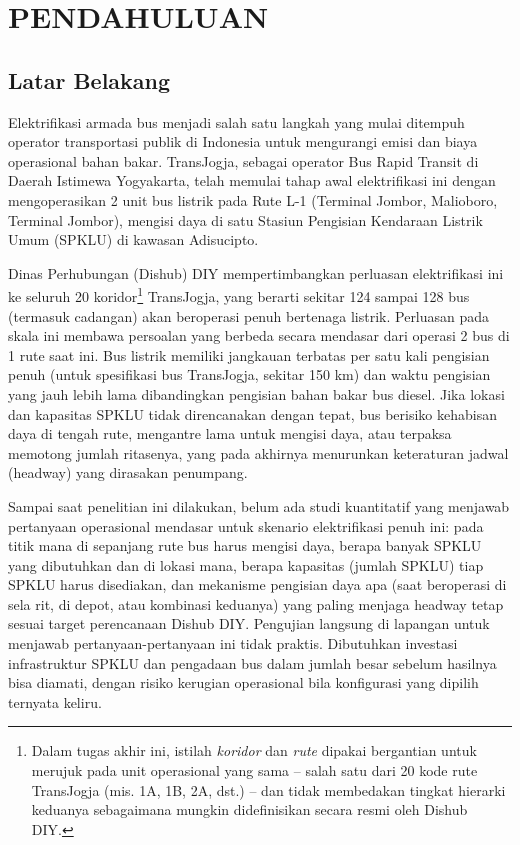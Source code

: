 \cleardoublepage %
\chapter{PENDAHULUAN}
\label{chap:pendahuluan}

\section{Latar Belakang}

Elektrifikasi armada bus menjadi salah satu langkah yang mulai ditempuh
operator transportasi publik di Indonesia untuk mengurangi emisi dan biaya
operasional bahan bakar. TransJogja, sebagai operator Bus Rapid Transit di
Daerah Istimewa Yogyakarta, telah memulai tahap awal elektrifikasi ini dengan
mengoperasikan 2 unit bus listrik pada Rute L-1 (Terminal Jombor, Malioboro,
Terminal Jombor), mengisi daya di satu Stasiun Pengisian Kendaraan Listrik
Umum (SPKLU) di kawasan Adisucipto.

Dinas Perhubungan (Dishub) DIY mempertimbangkan perluasan elektrifikasi ini
ke seluruh 20 koridor\footnote{Dalam tugas akhir ini, istilah
\textit{koridor} dan \textit{rute} dipakai bergantian untuk merujuk pada
unit operasional yang sama -- salah satu dari 20 kode rute TransJogja
(mis. 1A, 1B, 2A, dst.) -- dan tidak membedakan tingkat hierarki
keduanya sebagaimana mungkin didefinisikan secara resmi oleh Dishub DIY.}
TransJogja, yang berarti sekitar 124 sampai 128 bus
(termasuk cadangan) akan beroperasi penuh bertenaga listrik. Perluasan pada
skala ini
membawa persoalan yang berbeda secara mendasar dari operasi 2 bus di 1 rute
saat ini. Bus listrik memiliki jangkauan terbatas per satu kali pengisian
penuh (untuk spesifikasi bus TransJogja, sekitar 150 km) dan waktu pengisian
yang jauh lebih lama dibandingkan pengisian bahan bakar bus diesel. Jika
lokasi dan kapasitas SPKLU tidak direncanakan dengan tepat, bus berisiko
kehabisan daya di tengah rute, mengantre lama untuk mengisi daya, atau
terpaksa memotong jumlah ritasenya, yang pada akhirnya menurunkan
keteraturan jadwal (headway) yang dirasakan penumpang.

Sampai saat penelitian ini dilakukan, belum ada studi kuantitatif yang
menjawab pertanyaan operasional mendasar untuk skenario elektrifikasi penuh
ini: pada titik mana di sepanjang rute bus harus mengisi daya, berapa banyak
SPKLU yang dibutuhkan dan di lokasi mana, berapa kapasitas (jumlah SPKLU)
tiap SPKLU harus disediakan, dan mekanisme pengisian daya apa (saat beroperasi
di sela rit, di depot, atau kombinasi keduanya) yang paling menjaga headway
tetap sesuai target perencanaan Dishub DIY. Pengujian langsung di lapangan
untuk menjawab pertanyaan-pertanyaan ini tidak praktis. Dibutuhkan investasi
infrastruktur SPKLU dan pengadaan bus dalam jumlah besar sebelum hasilnya bisa
diamati, dengan risiko kerugian operasional bila konfigurasi yang dipilih
ternyata keliru.

